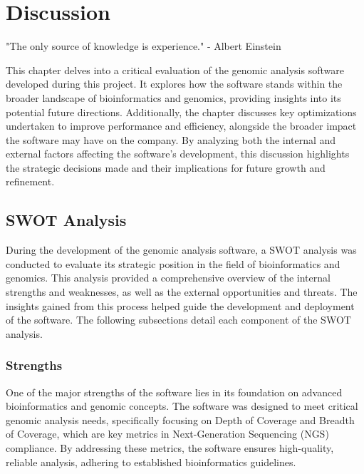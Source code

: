 \chapter{Discussion}
\label{chapter:Discussion}

\begin{introduction}
    "The only source of knowledge is experience." - Albert Einstein
\end{introduction}

This chapter delves into a critical evaluation of the genomic analysis software developed during this project. It explores how the software stands within the broader landscape of bioinformatics and genomics, providing insights into its potential future directions. Additionally, the chapter discusses key optimizations undertaken to improve performance and efficiency, alongside the broader impact the software may have on the company. By analyzing both the internal and external factors affecting the software's development, this discussion highlights the strategic decisions made and their implications for future growth and refinement.

\section{\acs{SWOT} Analysis} \label{sec:intro_swot}

During the development of the genomic analysis software, a \ac{SWOT} analysis was conducted to evaluate its strategic position in the field of bioinformatics and genomics. This analysis provided a comprehensive overview of the internal strengths and weaknesses, as well as the external opportunities and threats. The insights gained from this process helped guide the development and deployment of the software. The following subsections detail each component of the \ac{SWOT} analysis.

\subsection{Strengths}

One of the major strengths of the software lies in its foundation on advanced bioinformatics and genomic concepts. The software was designed to meet critical genomic analysis needs, specifically focusing on Depth of Coverage and Breadth of Coverage, which are key metrics in Next-Generation Sequencing (NGS) compliance. By addressing these metrics, the software ensures high-quality, reliable analysis, adhering to established bioinformatics guidelines.

